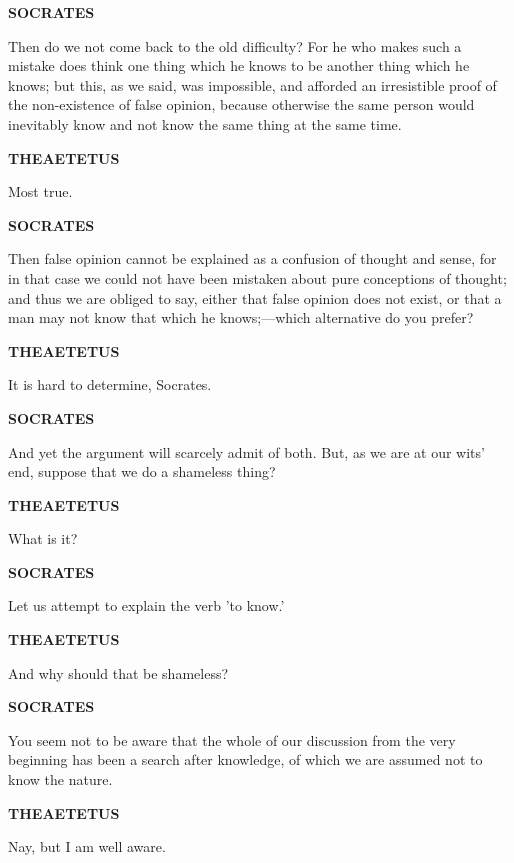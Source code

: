 \documentclass[11pt,letter]{article}
\begin{document}
\par \textbf{SOCRATES}
\par   Then do we not come back to the old difficulty? For he who makes such a mistake does think one thing which he knows to be another thing which he knows; but this, as we said, was impossible, and afforded an irresistible proof of the non-existence of false opinion, because otherwise the same person would inevitably know and not know the same thing at the same time.

\par \textbf{THEAETETUS}
\par   Most true.

\par \textbf{SOCRATES}
\par   Then false opinion cannot be explained as a confusion of thought and sense, for in that case we could not have been mistaken about pure conceptions of thought; and thus we are obliged to say, either that false opinion does not exist, or that a man may not know that which he knows;—which alternative do you prefer?

\par \textbf{THEAETETUS}
\par   It is hard to determine, Socrates.

\par \textbf{SOCRATES}
\par   And yet the argument will scarcely admit of both. But, as we are at our wits' end, suppose that we do a shameless thing?

\par \textbf{THEAETETUS}
\par   What is it?

\par \textbf{SOCRATES}
\par   Let us attempt to explain the verb 'to know.'

\par \textbf{THEAETETUS}
\par   And why should that be shameless?

\par \textbf{SOCRATES}
\par   You seem not to be aware that the whole of our discussion from the very beginning has been a search after knowledge, of which we are assumed not to know the nature.

\par \textbf{THEAETETUS}
\par   Nay, but I am well aware.
\end{document}
